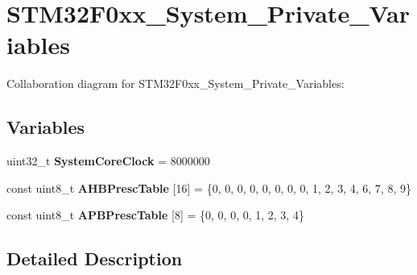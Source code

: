 \hypertarget{group___s_t_m32_f0xx___system___private___variables}{}\section{S\+T\+M32\+F0xx\+\_\+\+System\+\_\+\+Private\+\_\+\+Variables}
\label{group___s_t_m32_f0xx___system___private___variables}
Collaboration diagram for S\+T\+M32\+F0xx\+\_\+\+System\+\_\+\+Private\+\_\+\+Variables\+:
\subsection*{Variables}
\begin{DoxyCompactItemize}
\item 
\mbox{\label{group___s_t_m32_f0xx___system___private___variables_gaa3cd3e43291e81e795d642b79b6088e6}} 
uint32\+\_\+t {\bfseries System\+Core\+Clock} = 8000000
\item 
\mbox{\label{group___s_t_m32_f0xx___system___private___variables_ga6e1d9cd666f0eacbfde31e9932a93466}} 
const uint8\+\_\+t {\bfseries A\+H\+B\+Presc\+Table} \mbox{[}16\mbox{]} = \{0, 0, 0, 0, 0, 0, 0, 0, 1, 2, 3, 4, 6, 7, 8, 9\}
\item 
\mbox{\label{group___s_t_m32_f0xx___system___private___variables_ga5b4f8b768465842cf854a8f993b375e9}} 
const uint8\+\_\+t {\bfseries A\+P\+B\+Presc\+Table} \mbox{[}8\mbox{]} = \{0, 0, 0, 0, 1, 2, 3, 4\}
\end{DoxyCompactItemize}


\subsection{Detailed Description}

